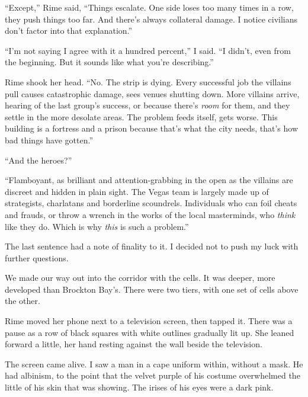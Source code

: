 ``Except,'' Rime said, ``Things escalate.  One side loses too many times in a row, they push things too far.  And there's always collateral damage.  I notice civilians don't factor into that explanation.''



``I'm not saying I agree with it a hundred percent,'' I said.  ``I didn't, even from the beginning.  But it sounds like what you're describing.''



Rime shook her head.  ``No.  The strip is dying.  Every successful job the villains pull causes catastrophic damage, sees venues shutting down.  More villains arrive, hearing of the last group's success, or because there's \emph{room} for them, and they settle in the more desolate areas.  The problem feeds itself, gets worse.  This building is a fortress and a prison because that's what the city needs, that's how bad things have gotten.''



``And the heroes?''



``Flamboyant, as brilliant and attention-grabbing in the open as the villains are discreet and hidden in plain sight.  The Vegas team is largely made up of strategists, charlatans and borderline scoundrels.  Individuals who can foil cheats and frauds, or throw a wrench in the works of the local masterminds, who \emph{think} like they do.  Which is why \emph{this} is such a problem.''



The last sentence had a note of finality to it.  I decided not to push my luck with further questions.



We made our way out into the corridor with the cells.  It was deeper, more developed than Brockton Bay's.  There were two tiers, with one set of cells above the other.



Rime moved her phone next to a television screen, then tapped it.  There was a pause as a row of black squares with white outlines gradually lit up.  She leaned forward a little, her hand resting against the wall beside the television.



The screen came alive.  I saw a man in a cape uniform within, without a mask.  He had albinism, to the point that the velvet purple of his costume overwhelmed the little of his skin that was showing.  The irises of his eyes were a dark pink.



